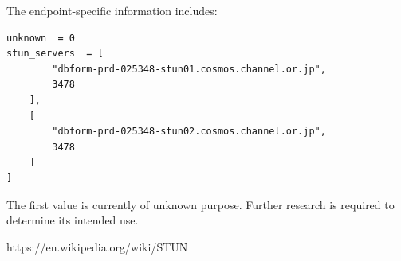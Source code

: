 The endpoint-specific information includes:

\begin{lstlisting}
unknown  = 0
stun_servers  = [
        "dbform-prd-025348-stun01.cosmos.channel.or.jp",
        3478
    ],
    [
        "dbform-prd-025348-stun02.cosmos.channel.or.jp",
        3478
    ]
]
\end{lstlisting}

\begin{tcolorbox}[colback=yellow!10,colframe=orange!80!black,title=Warning]
The first value is currently of unknown purpose.
Further research is required to determine its intended use.
\end{tcolorbox}

\begin{tcolorbox}[colback=green!10,colframe=blue!80!black,title=Info]
https://en.wikipedia.org/wiki/STUN
\end{tcolorbox}

\newpage